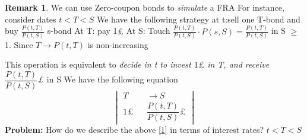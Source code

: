 \documentclass[10pt, oneside, reqno]{amsbook}
\theoremstyle{plain}%
\theoremstyle{definition}
\theoremstyle{rem}
\newtheorem*{rem}{Remark}
\theoremstyle{definition}
\newcommand{\lt}{<}
\numberwithin{equation}{chapter}
\begin{document}
\begin{rem}
We can use Zero-coupon bonds to \textit{simulate} a FRA
For instance, consider dates $t \lt T \lt S$ 
We have the following strategy at t:sell one T-bond and buy $\frac{P(t,T)}{P(t,S)}$ s-bond
At T: pay 1$\pounds$ 
At S: Touch $\frac{P(t,T)}{P(t,S)}\cdot P(s,S)= \frac{P(t,T)}{P(t,S)}$ in S $\geq$ 1. 
Since $T \to P(t,T)$ is non-increasing
\end{rem}
This operation is equivalent to \textit{decide in t to invest $1 \pounds$ in T, and receive $\dfrac{P(t,T)}{P(t,S)}$\pounds
}in S
We have the following equation
\begin{equation}\label{1}
 \begin{vmatrix}
  T \;&& \rightarrow  S\\
  1 \pounds &&  \dfrac{P(t,T)}{P(t,S)}\pounds
 \end{vmatrix}
\end{equation}
\textbf{Problem:}
How do we describe the above \ref{1} in terms of interest rates?
$t \lt T \lt S$
\end{document}
